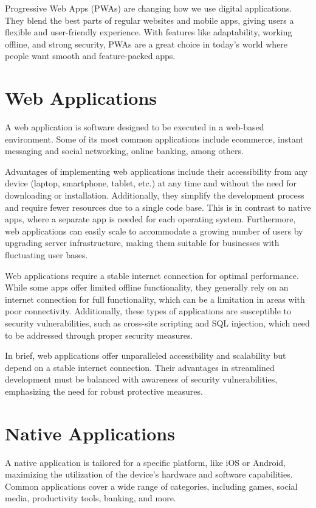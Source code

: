 \documentclass[conference]{IEEEtran}
\begin{document}
Progressive Web Apps (PWAs) are changing how we use digital applications. They blend the best parts of regular websites and mobile apps, giving users a flexible and user-friendly experience. With features like adaptability, working offline, and strong security, PWAs are a great choice in today's world where people want smooth and feature-packed apps.
\section{Web Applications}
A web application is software designed to be executed in a web-based environment. Some of its most common applications include ecommerce, instant messaging and social networking, online banking, among others.

Advantages of implementing web applications include their accessibility from any device (laptop, smartphone, tablet, etc.) at any time and without the need for downloading or installation. Additionally, they simplify the development process and require fewer resources due to a single code base. This is in contrast to native apps, where a separate app is needed for each operating system. Furthermore, web applications can easily scale to accommodate a growing number of users by upgrading server infrastructure, making them suitable for businesses with fluctuating user bases.

Web applications require a stable internet connection for optimal performance. While some apps offer limited offline functionality, they generally rely on an internet connection for full functionality, which can be a limitation in areas with poor connectivity. Additionally, these types of applications are susceptible to security vulnerabilities, such as cross-site scripting and SQL injection, which need to be addressed through proper security measures.

In brief, web applications offer unparalleled accessibility and scalability but depend on a stable internet connection. Their advantages in streamlined development must be balanced with awareness of security vulnerabilities, emphasizing the need for robust protective measures.

\section{Native Applications}
A native application is tailored for a specific platform, like iOS or Android, maximizing the utilization of the device's hardware and software capabilities. Common applications cover a wide range of categories, including games, social media, productivity tools, banking, and more.
\end{document}
